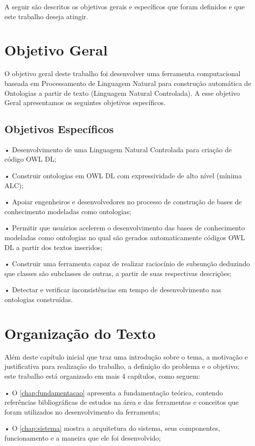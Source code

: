 \documentclass{bcc}
\begin{document}
A seguir são descritos os objetivos gerais e específicos que foram definidos e que este trabalho deseja atingir.

\section{Objetivo Geral}
O objetivo geral deste trabalho foi desenvolver uma ferramenta computacional baseada em Processamento de Linguagem Natural para construção automática de Ontologias a partir de texto (Linguagem Natural Controlada). A esse objetivo Geral apresentamos os seguintes objetivos específicos.

\subsection{Objetivos Específicos}
•	Desenvolvimento de uma Linguagem Natural Controlada para criação de código OWL DL;

•	Construir ontologias em OWL DL com expressividade de alto nível (mínima ALC);

•	Apoiar engenheiros e desenvolvedores no processo de construção de bases de conhecimento modeladas como ontologias;

•	Permitir que usuários acelerem o desenvolvimento das bases de conhecimento modeladas como ontologias no qual são gerados automaticamente códigos OWL DL a partir dos textos inseridos;

•	Construir uma ferramenta capaz de realizar raciocínio de subsunção deduzindo que classes são subclasses de outras, a partir de suas respectivas descrições;

•	Detectar e verificar inconsistências em tempo de desenvolvimento nas ontologias construídas.

\section{Organização do Texto}

Além deste capítulo inicial que traz uma introdução sobre o tema, a motivação e justificativa para realização do trabalho, a definição do problema e o objetivo; este trabalho está organizado em mais 4 capítulos, como seguem:

• O \autoref{chap:fundamentacao} apresenta a fundamentação teórica, contendo referências bibliográficas de estudos na área e das ferramentas e conceitos que foram utilizados no desenvolvimento da ferramenta;

• O \autoref{chap:sistema} mostra a arquitetura do sistema, seus componentes, funcionamento e a maneira que ele foi desenvolvido;
\end{document}
